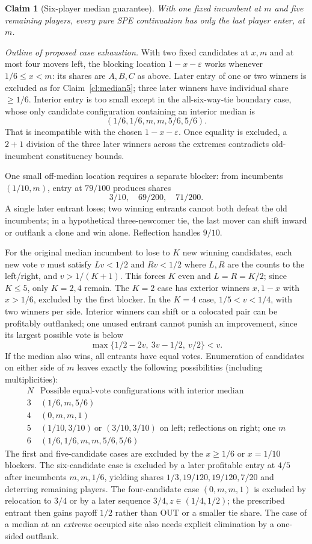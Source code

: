 \documentclass[10pt]{article}
\newtheorem{claim}{Claim}
\begin{document}
\begin{claim}[Six-player median guarantee]\label{cl:median6}
With one fixed incumbent at $m$ and five remaining players, every pure SPE continuation has only the last player enter, at $m$.
\end{claim}
\noindent\emph{Outline of proposed case exhaustion.} With two fixed candidates at $x,m$ and at most four movers left, the blocking location $1-x-\varepsilon$ works whenever $1/6\le x<m$: its shares are $A,B,C$ as above. Later entry of one or two winners is excluded as for Claim~\ref{cl:median5}; three later winners have individual share $\ge1/6$. Interior entry is too small except in the all-six-way-tie boundary case, whose only candidate configuration containing an interior median is
\[
 (1/6,1/6,m,m,5/6,5/6).
\tag{6.1}
\]
That is incompatible with the chosen $1-x-\varepsilon$. Once equality is excluded, a $2+1$ division of the three later winners across the extremes contradicts old-incumbent constituency bounds.

One small off-median location requires a separate blocker: from incumbents $(1/10,m)$, entry at $79/100$ produces shares
\[
 3/10,\quad69/200,\quad71/200.
\]
A single later entrant loses; two winning entrants cannot both defeat the old incumbents; in a hypothetical three-newcomer tie, the last mover can shift inward or outflank a clone and win alone. Reflection handles $9/10$.

For the original median incumbent to lose to $K$ new winning candidates, each new vote $v$ must satisfy $Lv<1/2$ and $Rv<1/2$ where $L,R$ are the counts to the left/right, and $v>1/(K+1)$. This forces $K$ even and $L=R=K/2$; since $K\le5$, only $K=2,4$ remain. The $K=2$ case has exterior winners $x,1-x$ with $x>1/6$, excluded by the first blocker. In the $K=4$ case, $1/5<v<1/4$, with two winners per side. Interior winners can shift or a colocated pair can be profitably outflanked; one unused entrant cannot punish an improvement, since its largest possible vote is below
\[
 \max\{1/2-2v,\ 3v-1/2,\ v/2\}<v.
\]
If the median also wins, all entrants have equal votes. Enumeration of candidates on either side of $m$ leaves exactly the following possibilities (including multiplicities):
\[
\begin{array}{c|l}
N&\text{Possible equal-vote configurations with interior median}\\\hline
3&(1/6,m,5/6)\\
4&(0,m,m,1)\\
5&(1/10,3/10)\ \text{or }(3/10,3/10)\text{ on left; reflections on right; one }m\\
6&(1/6,1/6,m,m,5/6,5/6)
\end{array}
\]
The first and five-candidate cases are excluded by the $x\ge1/6$ or $x=1/10$ blockers. The six-candidate case is excluded by a later profitable entry at $4/5$ after incumbents $m,m,1/6$, yielding shares $1/3,19/120,19/120,7/20$ and deterring remaining players. The four-candidate case $(0,m,m,1)$ is excluded by relocation to $3/4$ or by a later sequence $3/4,z\in(1/4,1/2)$; the prescribed entrant then gains payoff $1/2$ rather than OUT or a smaller tie share. The case of a median at an \emph{extreme} occupied site also needs explicit elimination by a one-sided outflank.
\end{document}
